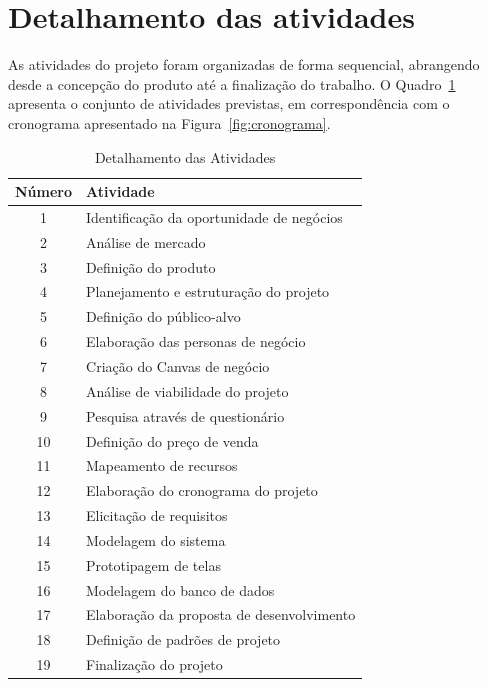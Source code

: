 
\section{Detalhamento das atividades}

As atividades do projeto foram organizadas de forma sequencial, abrangendo desde a concepção do produto até a finalização do trabalho. O Quadro~\ref{quad:atividades} apresenta o conjunto de atividades previstas, em correspondência com o cronograma apresentado na Figura~\ref{fig:cronograma}.

\begin{table}[H]
\centering
\caption{Detalhamento das Atividades}
\label{quad:atividades}
\begin{tabular}{|c|p{10cm}|}
\hline
\textbf{Número} & \textbf{Atividade} \\ \hline
1 & Identificação da oportunidade de negócios \\ \hline
2 & Análise de mercado \\ \hline
3 & Definição do produto \\ \hline
4 & Planejamento e estruturação do projeto \\ \hline
5 & Definição do público-alvo \\ \hline
6 & Elaboração das personas de negócio \\ \hline
7 & Criação do Canvas de negócio \\ \hline
8 & Análise de viabilidade do projeto \\ \hline
9 & Pesquisa através de questionário \\ \hline
10 & Definição do preço de venda \\ \hline
11 & Mapeamento de recursos \\ \hline
12 & Elaboração do cronograma do projeto \\ \hline
13 & Elicitação de requisitos \\ \hline
14 & Modelagem do sistema \\ \hline
15 & Prototipagem de telas \\ \hline
16 & Modelagem do banco de dados \\ \hline
17 & Elaboração da proposta de desenvolvimento \\ \hline
18 & Definição de padrões de projeto \\ \hline
19 & Finalização do projeto \\ \hline
\end{tabular}

\end{table}

